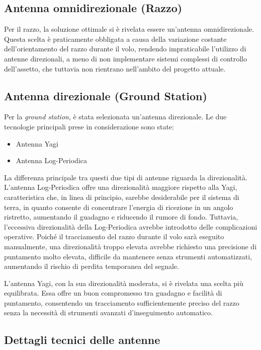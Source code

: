 \documentclass[12pt,a4paper,twoside]{book}
\begin{document}
\subsection*{Antenna omnidirezionale (Razzo)}

Per il razzo, la soluzione ottimale si è rivelata essere un'antenna omnidirezionale.
Questa scelta è praticamente obbligata a causa della variazione costante dell'orientamento
del razzo durante il volo, rendendo impraticabile l'utilizzo di antenne direzionali,
a meno di non implementare sistemi complessi di controllo dell'assetto, che
tuttavia non rientrano nell'ambito del progetto attuale.

\subsection*{Antenna direzionale (Ground Station)}

Per la \emph{ground station}, è stata selezionata un'antenna direzionale. Le due
tecnologie principali prese in considerazione sono state:
\begin{itemize}
    \item Antenna Yagi
    \item Antenna Log-Periodica
\end{itemize}

La differenza principale tra questi due tipi di antenne riguarda la direzionalità.
L'antenna Log-Periodica offre una direzionalità maggiore rispetto alla Yagi,
caratteristica che, in linea di principio, sarebbe desiderabile per il sistema
di terra, in quanto consente di concentrare l'energia di ricezione in un angolo
ristretto, aumentando il guadagno e riducendo il rumore di fondo.
Tuttavia, l'eccessiva direzionalità della Log-Periodica avrebbe introdotto
delle complicazioni operative. Poiché il tracciamento del razzo durante il volo
sarà eseguito manualmente, una direzionalità troppo elevata avrebbe richiesto
una precisione di puntamento molto elevata, difficile da mantenere senza
strumenti automatizzati, aumentando il rischio di perdita temporanea del segnale.

L'antenna Yagi, con la sua direzionalità moderata, si è rivelata una scelta più
equilibrata. Essa offre un buon compromesso tra guadagno e facilità di puntamento,
consentendo un tracciamento sufficientemente preciso del razzo senza la necessità
di strumenti avanzati d'inseguimento automatico.

\subsection*{Dettagli tecnici delle antenne}
\end{document}

